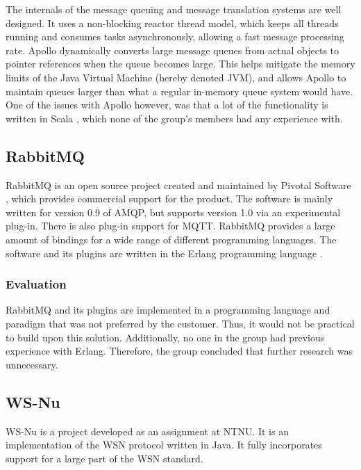 The internals of the message queuing and message translation systems are well designed. It uses a non-blocking reactor thread model, which keeps all threads running and consumes tasks asynchronously, allowing a fast message processing rate. Apollo dynamically converts large message queues from actual objects to pointer references when the queue becomes large. This helps mitigate the memory limits of the Java Virtual Machine (hereby denoted JVM), and allows Apollo to maintain queues larger than what a regular in-memory queue system would have. One of the issues with Apollo however, was that a lot of the functionality is written in Scala  \cite{scala}, which none of the group's members had any experience with.

\subsection{RabbitMQ}
\label{subsec:prestudies-existing_solutions-rabbitmq}

RabbitMQ \cite{rabbit-mq} is an open source project created and maintained by Pivotal Software \cite{pivotal-software}, which provides commercial support for the product. The software is mainly written for version 0.9 of AMQP, but supports version 1.0 via an experimental plug-in. There is also plug-in support for MQTT. RabbitMQ provides a large amount of bindings for a wide range of different programming languages. The software and its plugins are written in the Erlang programming language \cite{erlang}.

\subsubsection{Evaluation}
\label{subsec:prestudies-existing_solutions-rabbitmq-evaluation}

RabbitMQ and its plugins are implemented in a programming language and paradigm that was not preferred by the customer. Thus, it would not be practical to build upon this solution. Additionally, no one in the group had previous experience with Erlang. Therefore, the group concluded that further research was unnecessary.

\subsection{WS-Nu}
\label{subsec:prestudies-existing_solutions-ws_nu}

WS-Nu \cite{ws-nu} is a project developed as an assignment at NTNU. It is an implementation of the WSN protocol written in Java. It fully incorporates support for a large part of the WSN standard.

